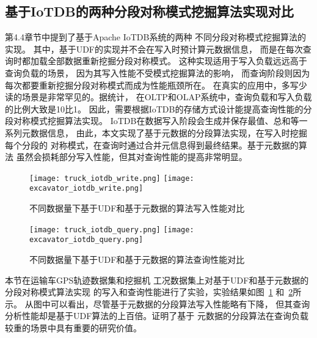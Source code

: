 \subsection{基于IoTDB的两种分段对称模式挖掘算法实现对比}
第4.4章节中提到了基于Apache IoTDB系统的两种
不同分段对称模式挖掘算法的实现。
其中，基于UDF的实现并不会在写入时预计算元数据信息，
而是在每次查询时都加载全部数据重新挖掘分段对称模式。
这种实现适用于写入负载远远高于查询负载的场景，
因为其写入性能不受模式挖掘算法的影响，
而查询阶段则因为每次都要重新挖掘分段对称模式而成为性能瓶颈所在。
在真实的应用中，多写少读的场景是非常罕见的。据统计，
在OLTP和OLAP系统中，查询负载和写入负载的比例大致是10比1。
因此，需要根据IoTDB的存储方式设计能提高查询性能的分段对称模式挖掘算法实现。
IoTDB在数据写入阶段会生成并保存最值、总和等一系列元数据信息，
由此，本文实现了基于元数据的分段算法实现，在写入时挖掘每个分段的
对称模式，在查询时通过合并元信息得到最终结果。基于元数据的算法
虽然会损耗部分写入性能，但其对查询性能的提高非常明显。

\begin{figure}
  \centering
  {\texttt{[image: truck\_iotdb\_write.png]}}
  {\texttt{[image: excavator\_iotdb\_write.png]}}
  \caption{不同数据量下基于UDF和基于元数据的算法写入性能对比}
  \label{fig:iotdb_write}
\end{figure}

\begin{figure}
\centering
{}
{\texttt{[image: truck\_iotdb\_query.png]}}
{\texttt{[image: excavator\_iotdb\_query.png]}}
\caption{不同数据量下基于UDF和基于元数据的算法查询性能对比}
\label{fig:iotdb_query}
\end{figure}

本节在运输车GPS轨迹数据集和挖掘机
工况数据集上对基于UDF和基于元数据的分段对称模式算法实现
的写入和查询性能进行了实验，实验结果如图~\ref{fig:iotdb_write}
和~\ref{fig:iotdb_query}所示。
从图中可以看出，尽管基于元数据的分段算法写入性能略有下降，
但其查询分析性能却是基于UDF算法的上百倍。证明了基于
元数据的分段算法在查询负载较重的场景中具有重要的研究价值。

